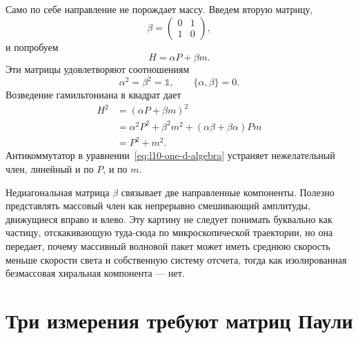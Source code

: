 Само по себе направление не порождает массу. Введем вторую матрицу,
\begin{equation}
\beta=
\begin{pmatrix}
0&1\\
1&0
\end{pmatrix},
\end{equation}
и попробуем
\begin{equation}
H=\alpha P+\beta m.
\label{eq:l10-massive-one-d}
\end{equation}
Эти матрицы удовлетворяют соотношениям
\begin{equation}
\alpha^2=\beta^2=\mathbb{1},
\qquad
\{\alpha,\beta\}=0.
\label{eq:l10-one-d-algebra}
\end{equation}
Возведение гамильтониана в квадрат дает
\begin{align}
H^2
&=(\alpha P+\beta m)^2\\
&=\alpha^2P^2+\beta^2m^2
  +(\alpha\beta+\beta\alpha)Pm\\
&=P^2+m^2.
\label{eq:l10-one-d-dispersion}
\end{align}
Антикоммутатор в уравнении~\eqref{eq:l10-one-d-algebra} устраняет нежелательный член, линейный и по \(P\), и по \(m\).

Недиагональная матрица \(\beta\) связывает две направленные компоненты. Полезно представлять массовый член как непрерывно смешивающий амплитуды, движущиеся вправо и влево. Эту картину не следует понимать буквально как частицу, отскакивающую туда-сюда по микроскопической траектории, но она передает, почему массивный волновой пакет может иметь среднюю скорость меньше скорости света и собственную систему отсчета, тогда как изолированная безмассовая хиральная компонента — нет.

\begin{classroomqa}
\end{classroomqa}

\section{Три измерения требуют матриц Паули}


